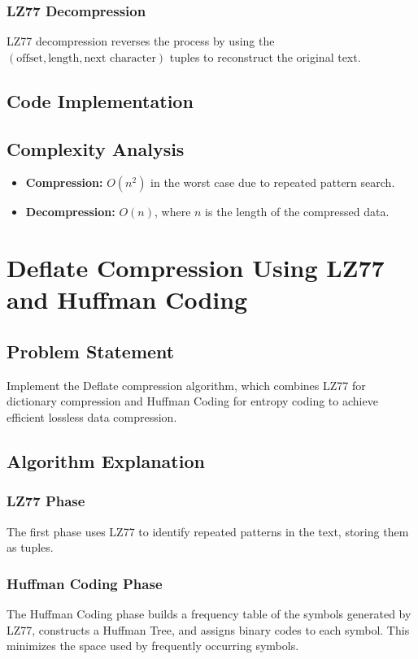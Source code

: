 \documentclass[10pt,a4paper]{report}
\begin{document}
\subsection{LZ77 Decompression}
LZ77 decompression reverses the process by using the $(\text{offset}, \text{length}, \text{next character})$ tuples to reconstruct the original text.

\section{Code Implementation}


\section{Complexity Analysis}
\begin{itemize}
    \item \textbf{Compression:} $O(n^2)$ in the worst case due to repeated pattern search.
    \item \textbf{Decompression:} $O(n)$, where $n$ is the length of the compressed data.
\end{itemize}

\chapter{Deflate Compression Using LZ77 and Huffman Coding}
\section{Problem Statement}
Implement the Deflate compression algorithm, which combines LZ77 for dictionary compression and Huffman Coding for entropy coding to achieve efficient lossless data compression.

\section{Algorithm Explanation}
\subsection{LZ77 Phase}
The first phase uses LZ77 to identify repeated patterns in the text, storing them as tuples.

\subsection{Huffman Coding Phase}
The Huffman Coding phase builds a frequency table of the symbols generated by LZ77, constructs a Huffman Tree, and assigns binary codes to each symbol. This minimizes the space used by frequently occurring symbols.
\end{document}
